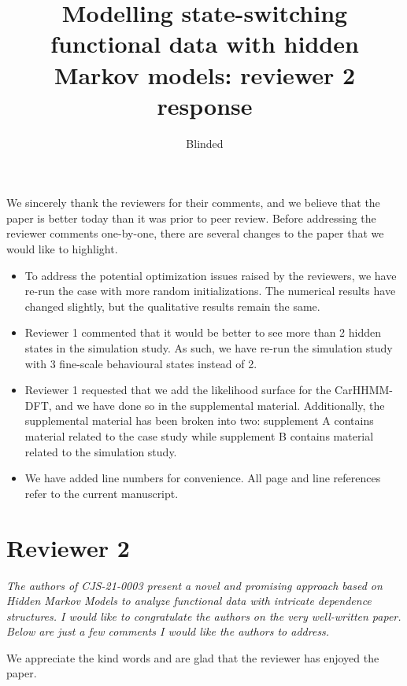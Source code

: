 \documentclass{article}
\begin{document}
\title{Modelling state-switching functional data with hidden Markov models: reviewer 2 response}
\date{}
\author{Blinded}

\maketitle

We sincerely thank the reviewers for their comments, and we believe that the paper is better today than it was prior to peer review. Before addressing the reviewer comments one-by-one, there are several changes to the paper that we would like to highlight.

\begin{itemize}
    \item To address the potential optimization issues raised by the reviewers, we have re-run the case with more random initializations. The numerical results have changed slightly, but the qualitative results remain the same.
    \item Reviewer 1 commented that it would be better to see more than 2 hidden states in the simulation study. As such, we have re-run the simulation study with 3 fine-scale behavioural states instead of 2.
    \item Reviewer 1 requested that we add the likelihood surface for the CarHHMM-DFT, and we have done so in the supplemental material. Additionally, the supplemental material has been broken into two: supplement A contains material related to the case study while supplement B contains material related to the simulation study. 
    \item We have added line numbers for convenience. All page and line references refer to the current manuscript.
\end{itemize}

\section{Reviewer 2}

\textit{The authors of CJS-21-0003 present a novel and promising approach based on Hidden Markov Models to analyze functional data with intricate dependence structures. I would like to congratulate the authors on the very well-written paper. Below are just a few comments I would like the authors to address.}

We appreciate the kind words and are glad that the reviewer has enjoyed the paper.
\end{document}
